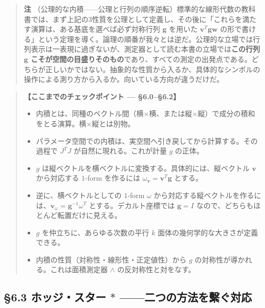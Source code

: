 \documentclass[a4paper,12pt,openany]{book}
\begin{document}
\begin{quote}
\textbf{注}
（公理的な内積——公理と行列の順序逆転）標準的な線形代数の教科書では、まず上記の3性質を公理として定義し、その後に「これらを満たす演算は、ある基底を選べば必ず対称行列
\(\mathbf{g}\) を用いた \(\mathbf{v}^T \mathbf{g} \mathbf{w}\)
の形で書ける」という定理を導く。論理の順番が我々とは逆だ。公理的な立場では行列表示は一表現に過ぎないが、測定器として読む本書の立場では\textbf{この行列 $\mathbf{g}$ こそが空間の目盛りそのもの}であり、すべての測定の出発点である。どちらが正しいかではない。抽象的な性質から入るか、具体的なシンボルの操作による測り方から入るか。向いている方向が違うだけだ。
\end{quote}

\begin{quote}
\textbf{【ここまでのチェックポイント — §6.0–§6.2】}

\begin{itemize}
\item
  内積とは、同種のベクトル間（横×横、または縦×縦）で成分の積和をとる演算。横×縦とは別物。
\item
  パラメータ空間での内積は、実空間へ引き戻してから計算する。その過程で
  \(J^T J\) が自然に現れる。これが計量 \(g\) の正体。
\item
  \(g\) は縦ベクトルを横ベクトルに変換する。具体的には、縦ベクトル
  \(\mathbf{v}\) から対応する \(1\)-form を作るには
  \(\omega_{\mathbf{v}} = \mathbf{v}^T\mathbf{g}\) とする。
\item
  逆に、横ベクトルとしての \(1\)-form \(\omega\)
  から対応する縦ベクトルを作るには、\(\mathbf{v}_\omega = \mathbf{g}^{-1}\omega^T\)
  とする。デカルト座標では \(\mathbf{g}=I\)
  なので、どちらもほとんど転置だけに見える。
\item
  \(g\) を仲立ちに、あらゆる次数の平行 \(k\)
  面体の幾何学的な大きさが定義できる。
\item
  内積の性質（対称性・線形性・正定値性）から \(g\)
  の対称性が導かれる。これは面積測定器 \(\wedge\) の反対称性と対をなす。
\end{itemize}
\end{quote}

\par\vspace{0.35em}\par

\hypertarget{ux30dbux30c3ux30b8ux30b9ux30bfux30fc-ast-ux4e8cux3064ux306eux65b9ux6cd5ux3092ux7e6bux3050ux5bfeux5fdc}{%
\subsection{\texorpdfstring{§6.3 ホッジ・スター \(\ast\)
——二つの方法を繫ぐ対応}{§6.3 ホッジ・スター \textbackslash ast ——二つの方法を繫ぐ対応}}\label{ux30dbux30c3ux30b8ux30b9ux30bfux30fc-ast-ux4e8cux3064ux306eux65b9ux6cd5ux3092ux7e6bux3050ux5bfeux5fdc}}
\end{document}
